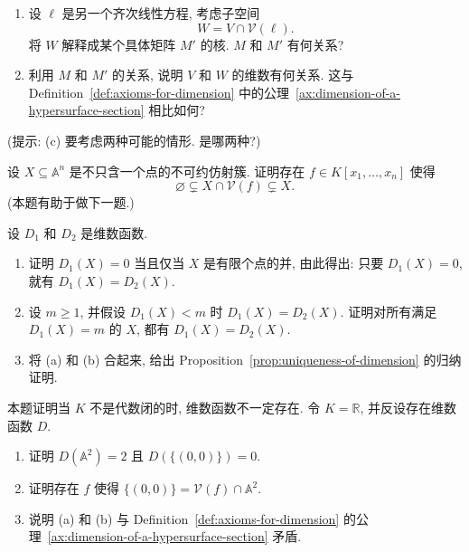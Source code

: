 \begin{BookExercises}
\begin{enumerate}
    \item 设 $\ell$ 是另一个齐次线性方程, 考虑子空间
    \[
      W=V\cap\mathcal{V}(\ell).
    \]
    将 $W$ 解释成某个具体矩阵 $M'$ 的核. $M$ 和 $M'$ 有何关系?
    \item 利用 $M$ 和 $M'$ 的关系, 说明 $V$ 和 $W$ 的维数有何关系. 这与 Definition~\ref{def:axioms-for-dimension} 中的公理~\ref{ax:dimension-of-a-hypersurface-section} 相比如何?
  \end{enumerate}
  (提示: (c) 要考虑两种可能的情形. 是哪两种?)
  \item\label{ex:proper-nonempty-hypersurface-section} 设 $X\subseteq\mathbb{A}^{n}$ 是不只含一个点的不可约仿射簇. 证明存在 $f\in K[x_{1},\ldots,x_{n}]$ 使得
  \[
    \varnothing\subsetneq X\cap\mathcal{V}(f)\subsetneq X.
  \]
  (本题有助于做下一题.)
  \item\label{ex:prove-dimension-function-unique} 设 $D_{1}$ 和 $D_{2}$ 是维数函数.
  \begin{enumerate}
    \item 证明 $D_{1}(X)=0$ 当且仅当 $X$ 是有限个点的并, 由此得出: 只要 $D_{1}(X)=0$, 就有 $D_{1}(X)=D_{2}(X)$.
    \item 设 $m\geq1$, 并假设 $D_{1}(X)<m$ 时 $D_{1}(X)=D_{2}(X)$. 证明对所有满足 $D_{1}(X)=m$ 的 $X$, 都有 $D_{1}(X)=D_{2}(X)$.
    \item 将 (a) 和 (b) 合起来, 给出 Proposition~\ref{prop:uniqueness-of-dimension} 的归纳证明.
  \end{enumerate}
  \item\label{ex:dimension-function-need-not-exist-over-reals} 本题证明当 $K$ 不是代数闭的时, 维数函数不一定存在. 令 $K=\mathbb{R}$, 并反设存在维数函数 $D$.
  \begin{enumerate}
    \item 证明 $D(\mathbb{A}^{2})=2$ 且 $D(\{(0,0)\})=0$.
    \item 证明存在 $f$ 使得 $\{(0,0)\}=\mathcal{V}(f)\cap\mathbb{A}^{2}$.
    \item 说明 (a) 和 (b) 与 Definition~\ref{def:axioms-for-dimension} 的公理~\ref{ax:dimension-of-a-hypersurface-section} 矛盾.
  \end{enumerate}
\end{BookExercises}

